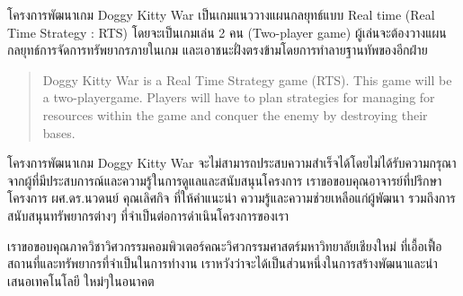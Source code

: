 \maketitle
\makesignature

\ifproject
\begin{abstractTH} %

\quad โครงการพัฒนาเกม Doggy Kitty War เป็นเกมแนววางแผนกลยุทธ์แบบ Real time (Real Time Strategy : RTS) โดยจะเป็นเกมเล่น 2 คน (Two-player game) ผู้เล่นจะต้องวางแผนกลยุทธ์การจัดการทรัพยากรภายในเกม และเอาชนะฝั่งตรงข้ามโดยการทำลายฐานทัพของอีกฝ่าย

\end{abstractTH}

\begin{abstract} %

\quad Doggy Kitty War is a Real Time Strategy game (RTS). This game will be a two-playergame. Players will have to plan strategies for managing for resources within
the game and conquer the enemy by destroying their bases.

\end{abstract}

\iffalse
\begin{dedication}
This document is dedicated to all Chiang Mai University students.

Dedication page is optional.
\end{dedication}
\fi %

\begin{acknowledgments}

\qquad โครงการพัฒนาเกม Doggy Kitty War จะไม่สามารถประสบความสําเร็จได้โดยไม่ได้รับความกรุณาจากผู้ที่มีประสบการณ์และความรู้ในการดูแลและสนับสนุนโครงการ เราขอขอบคุณอาจารย์ที่ปรึกษาโครงการ
ผศ.ดร.นวดนย์ คุณเลิศกิจ ที่ให้คําแนะนํา ความรู้และความช่วยเหลือแก่ผู้พัฒนา รวมถึงการสนับสนุนทรัพยากรต่างๆ ที่จําเป็นต่อการดําเนินโครงการของเรา

\enskip เราขอขอบคุณภาควิชาวิศวกรรมคอมพิวเตอร์คณะวิศวกรรมศาสตร์มหาวิทยาลัยเชียงใหม่ ที่เอื้อเฟื้อ\\สถานที่และทรัพยากรที่จําเป็นในการทํางาน เราหวังว่าจะได้เป็นส่วนหนึ่งในการสร้างพัฒนาและนําเสนอเทคโนโลยี
ใหม่ๆในอนาคต

\end{acknowledgments}%
\fi %

\contentspage

\ifproject
\figurelistpage

\tablelistpage
\fi %




